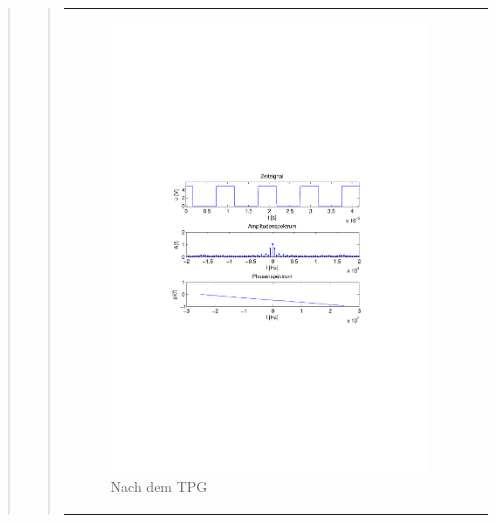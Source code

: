 \begin{quote}
\begin{quote}
         \begin{center}
            \begin{tabular}{ll}
            
            \hspace{-5cm}
                \begin{minipage}{0.67\textwidth}
                    \begin{figure}[H]
                        \includegraphics[scale=0.7, trim = 35mm 100mm 35mm 95mm, clip]{Bilder/TwPuB}
                        \caption{Nach dem TPG}
                        \label{fig:vorFilter}
                    \end{figure}
                \end{minipage}
                

\end{tabular}
\end{center}
\end{quote}
\end{quote}
